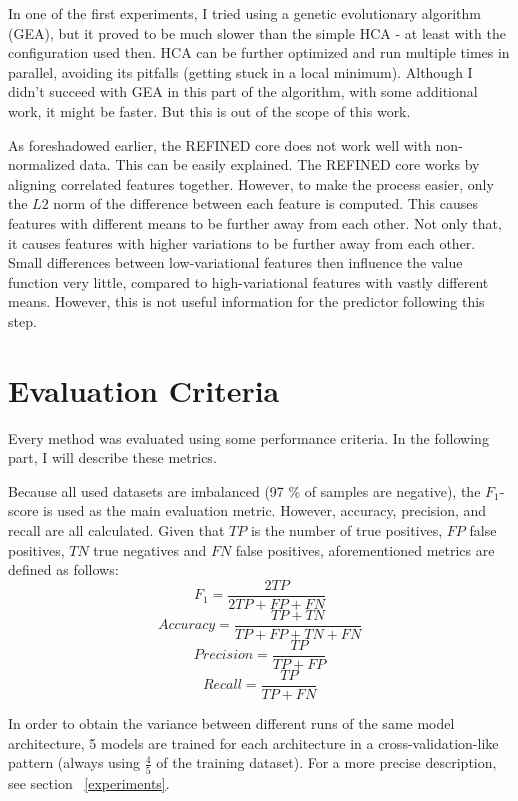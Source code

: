 In one of the first experiments, I tried using a genetic evolutionary algorithm (GEA), but it proved to be much slower than the simple HCA - at least with the configuration used then. HCA can be further optimized and run multiple times in parallel, avoiding its pitfalls (getting stuck in a local minimum). Although I didn't succeed with GEA in this part of the algorithm, with some additional work, it might be faster. But this is out of the scope of this work.

As foreshadowed earlier, the REFINED core does not work well with non-normalized data. This can be easily explained. The REFINED core works by aligning correlated features together. However, to make the process easier, only the $L2$ norm of the difference between each feature is computed. This causes features with different means to be further away from each other. Not only that, it causes features with higher variations to be further away from each other. Small differences between low-variational features then influence the value function very little, compared to high-variational features with vastly different means. However, this is not useful information for the predictor following this step.

\section{Evaluation Criteria}

Every method was evaluated using some performance criteria. In the following part, I will describe these metrics.

Because all used datasets are imbalanced (97 \% of samples are negative), the $F_1$-score is used as the main evaluation metric. However, accuracy, precision, and recall are all calculated. Given that $TP$ is the number of true positives, $FP$ false positives, $TN$ true negatives and $FN$ false positives, aforementioned metrics are defined as follows:
$$F_1 = \frac{2TP}{2TP + FP + FN}$$
$$Accuracy = \frac{TP + TN}{TP + FP + TN + FN}$$
$$Precision = \frac{TP}{TP + FP}$$
$$Recall = \frac{TP}{TP + FN}$$

In order to obtain the variance between different runs of the same model architecture, 5 models are trained for each architecture in a cross-validation-like pattern (always using $\frac{4}{5}$ of the training dataset). For a more precise description, see section ~\ref{experiments}.